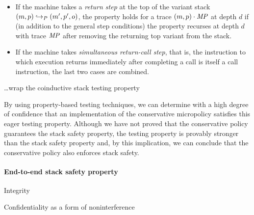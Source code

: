 \documentclass[acmsmall,review,anonymous]{acmart}\settopmatter{printfolios=true,printccs=false,printacmref=false}
\begin{document}
\begin{itemize}

  \item If the machine takes a \emph{return step} at the top of the variant stack
    $(m, p) \hookrightarrow_P (m', p', o)$,
    the property holds for a trace $(m, p) \cdot \mathit{MP}$ at depth $d$
    if (in addition to the general step conditions)
    the property recurses at depth $d$ with trace $\mathit{MP}$
    after removing the returning top variant from the stack.

  \item If the machine takes \emph{simultaneous return-call step}, that is, the
    instruction to which execution returns immediately after completing a call
    is itself a call instruction, the last two cases are combined.

  \end{itemize}

%
  \ldots wrap the coinductive stack testing property

By using property-based testing techniques, we can determine with a high degree
of confidence that an implementation of the conservative micropolicy satisfies
this eager testing property. Although we have not proved that the conservative
policy guarantees the stack safety property, the testing property is provably
stronger than the stack safety property  and, by this implication,
we can conclude that the conservative policy also enforces stack safety.



\paragraph*{End-to-end stack safety property}

Integrity

Confidentiality as a form of noninterference
\end{document}
